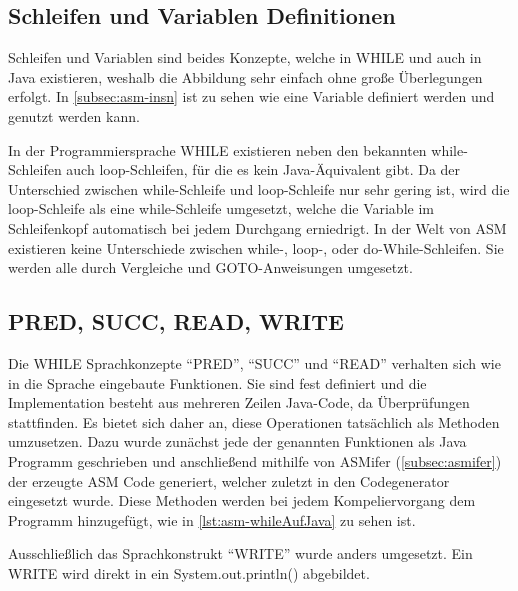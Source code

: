 \subsection{Schleifen und Variablen Definitionen}
Schleifen und Variablen sind beides Konzepte, welche in WHILE und auch in Java existieren, weshalb die Abbildung sehr einfach ohne große Überlegungen erfolgt. In \cref{subsec:asm-insn} ist zu sehen wie eine Variable definiert werden und genutzt werden kann. 

In der Programmiersprache WHILE existieren neben den bekannten while-Schleifen auch loop-Schleifen, für die es kein Java-Äquivalent gibt. Da der Unterschied zwischen while-Schleife und loop-Schleife nur sehr gering ist, wird die loop-Schleife als eine while-Schleife umgesetzt, welche die Variable im Schleifenkopf automatisch bei jedem Durchgang erniedrigt. In der Welt von ASM existieren keine Unterschiede zwischen while-, loop-, oder do-While-Schleifen. Sie werden alle durch Vergleiche und GOTO-Anweisungen umgesetzt.

\subsection{PRED, SUCC, READ, WRITE}
Die WHILE Sprachkonzepte \enquote{PRED}, \enquote{SUCC} und \enquote{READ} verhalten sich wie in die Sprache eingebaute Funktionen. Sie sind fest definiert und die Implementation besteht aus mehreren Zeilen Java-Code, da Überprüfungen stattfinden. Es bietet sich daher an, diese Operationen tatsächlich als Methoden umzusetzen. Dazu wurde zunächst jede der genannten Funktionen als Java Programm geschrieben und anschließend mithilfe von ASMifer (\cref{subsec:asmifer}) der erzeugte ASM Code generiert, welcher zuletzt in den Codegenerator eingesetzt wurde. Diese Methoden werden bei jedem Kompeliervorgang dem Programm hinzugefügt, wie in \cref{lst:asm-whileAufJava} zu sehen ist.

Ausschließlich das Sprachkonstrukt \enquote{WRITE} wurde anders umgesetzt. Ein WRITE wird direkt in ein System.out.println() abgebildet.